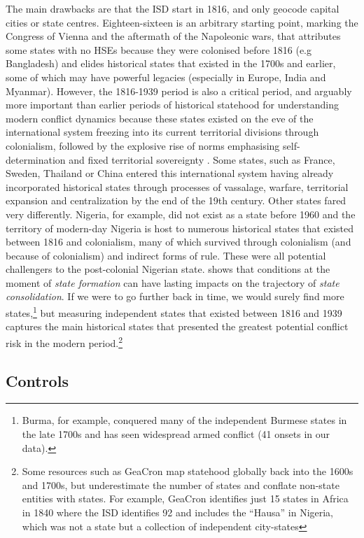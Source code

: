The main drawbacks are that the ISD start in 1816, and only geocode capital
cities or state centres. Eighteen-sixteen is an arbitrary starting point,
marking the Congress of Vienna and the aftermath of the Napoleonic wars, that
attributes some states with no HSEs because they were colonised before 1816 (e.g
Bangladesh) and elides historical states that existed in the 1700s and earlier,
some of which may have powerful legacies (especially in Europe, India and
Myanmar). However, the 1816-1939 period is also a critical period, and arguably
more important than earlier periods of historical statehood for understanding
modern conflict dynamics because these states existed on the eve of the
international system freezing into its current territorial divisions through
colonialism, followed by the explosive rise of norms emphasising
self-determination and fixed territorial sovereignty \citep{Branch2013,
Ahram2019, Paine2019}. Some states, such as France, Sweden, Thailand or China
entered this international system having already incorporated historical states
through processes of vassalage, warfare, territorial expansion and
centralization by the end of the 19th century. Other states fared very
differently. Nigeria, for example, did not exist as a state before 1960 and the
territory of modern-day Nigeria is host to numerous historical states that
existed between 1816 and colonialism, many of which survived through colonialism
(and because of colonialism) and indirect forms of rule. These were all
potential challengers to the post-colonial Nigerian state. \citet{Mazzuca2021}
shows that conditions at the moment of \textit{state formation} can have lasting
impacts on the trajectory of \textit{state consolidation}. If we were to go
further back in time, we would surely find more states,\footnote{Burma, for
example, conquered many of the independent Burmese states in the late 1700s and
has seen widespread armed conflict (41 onsets in our data).} but measuring
independent states that existed between 1816 and 1939 captures the main
historical states that presented the greatest potential conflict risk in the
modern period.\footnote{Some resources such as GeaCron map statehood globally
	back into the 1600s and 1700s, but underestimate the number of states
	and conflate non-state entities with states. For example, GeaCron
identifies just 15 states in Africa in 1840 where the ISD identifies 92 and
includes the ``Hausa'' in Nigeria, which was not a state but a collection of
independent city-states} 

\subsection{Controls}

